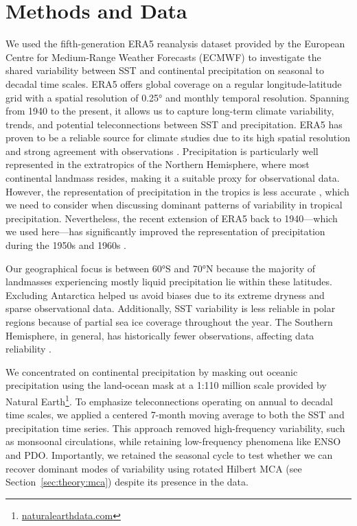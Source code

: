 \section{Methods and Data}\label{sec:tele:methods}

We used the fifth-generation ERA5 reanalysis dataset provided by the European Centre for Medium-Range Weather Forecasts (ECMWF) \cite{c3s_era5_monthly_single} to investigate the shared variability between SST and continental precipitation on seasonal to decadal time scales. ERA5 offers global coverage on a regular longitude-latitude grid with a spatial resolution of \ang{0.25} and monthly temporal resolution. Spanning from 1940 to the present, it allows us to capture long-term climate variability, trends, and potential teleconnections between SST and precipitation. ERA5 has proven to be a reliable source for climate studies due to its high spatial resolution and strong agreement with observations \cite{hersbach_era5_2020, yao_evaluation_2021, soci_era5_2024}. Precipitation is particularly well represented in the extratropics of the Northern Hemisphere, where most continental landmass resides, making it a suitable proxy for observational data. However, the representation of precipitation in the tropics is less accurate \cite{lavers_evaluation_2022}, which we need to consider when discussing dominant patterns of variability in tropical precipitation. Nevertheless, the recent extension of ERA5 back to 1940---which we used here---has significantly improved the representation of precipitation during the 1950s and 1960s \cite{soci_era5_2024}.

Our geographical focus is between \ang{60}S and \ang{70}N because the majority of landmasses experiencing mostly liquid precipitation lie within these latitudes. Excluding Antarctica helped us avoid biases due to its extreme dryness and sparse observational data. Additionally, SST variability is less reliable in polar regions because of partial sea ice coverage throughout the year. The Southern Hemisphere, in general, has historically fewer observations, affecting data reliability \cite{soci_era5_2024}.

We concentrated on continental precipitation by masking out oceanic precipitation using the land-ocean mask at a 1:110 million scale provided by Natural Earth\footnote{\url{naturalearthdata.com}}. To emphasize teleconnections operating on annual to decadal time scales, we applied a centered 7-month moving average to both the SST and precipitation time series. This approach removed high-frequency variability, such as monsoonal circulations, while retaining low-frequency phenomena like ENSO and PDO. Importantly, we retained the seasonal cycle to test whether we can recover dominant modes of variability using rotated Hilbert MCA (see Section~\ref{sec:theory:mca}) despite its presence in the data.

